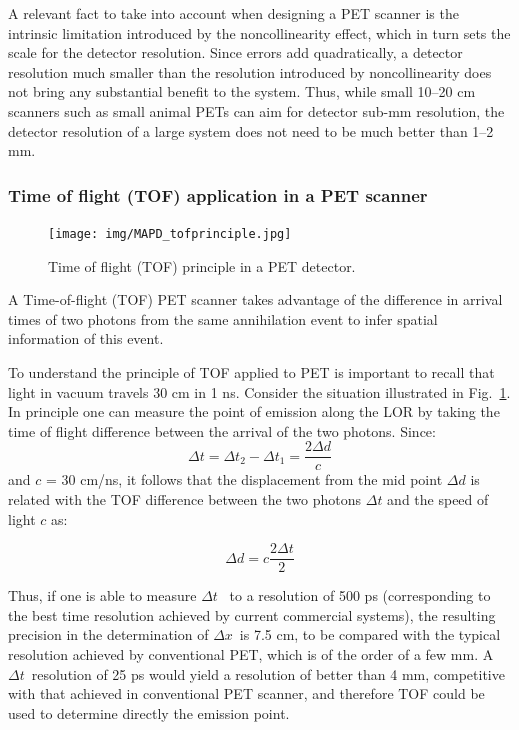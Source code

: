 A relevant fact to take into account when designing a PET scanner is the intrinsic limitation introduced by the noncollinearity effect, which in turn sets the scale for the detector resolution. Since errors add quadratically, a detector resolution much smaller than the resolution introduced by noncollinearity does not bring any substantial benefit to the system. Thus, while small 10--20 cm scanners such as small animal PETs can aim for detector sub-mm resolution, the detector resolution of a large system does not need to be much better than 1--2 mm. 

\subsubsection*{Time of flight (TOF) application in a PET scanner}

\begin{figure}[!bthp]
	\centering
	\texttt{[image: img/MAPD\_tofprinciple.jpg]}
	\caption{\label{fig.tof} Time of flight (TOF) principle in a PET detector.}
\end{figure}

A Time-of-flight (TOF) PET scanner takes advantage of the difference in arrival times of two photons from the same annihilation event to infer spatial information of this event. 

To understand the principle of TOF applied to PET is important to recall that light in vacuum travels 30 cm in 1 ns. Consider the situation illustrated in Fig.~\ref{fig.tof}. In principle one can measure the point of emission along the LOR by taking the time of flight difference between the arrival of the two photons. Since:
\begin{equation}
\Delta t = \Delta t_2 - \Delta t_1 = \frac{2 \Delta d}{c}
\end{equation}
%
and $c$ = 30 cm/ns, it follows that the displacement from the mid point
$\Delta d$ is related with the TOF difference between the two photons $\Delta t$ and the speed of light $c$ as:

\begin{equation}
\Delta d =c \frac{2 \Delta t}{2}
\end{equation}

Thus, if one is able to measure $\Delta t$~ to a resolution of 500 ps (corresponding to the
best time resolution achieved by current commercial systems), the resulting precision in the
determination of $\Delta x$~is 7.5 cm, to be compared with the typical resolution achieved by
conventional PET, which is of the order of a few mm. A $\Delta t$~resolution of 25 ps would yield a resolution of better than 4 mm, competitive with that achieved in conventional PET scanner, and therefore TOF could be used to determine directly the emission point. 

